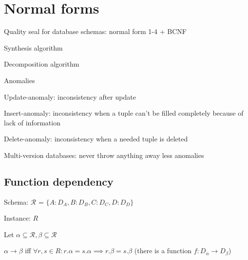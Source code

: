 \section{Normal forms}
\enumstart
	\item Quality seal for database schemas: normal form 1-4 + BCNF
	\item Synthesis algorithm
	\item Decomposition algorithm
	\item Anomalies
	\enumstart
		\item Update-anomaly: inconsistency after update
		\item Insert-anomaly: inconsistency when a tuple can't be filled completely because of lack of information
		\item Delete-anomaly: inconsistency when a needed tuple is deleted
	\enumend
	\item Multi-version databases: never throw anything away \arrow less anomalies
\enumend

\subsection{Function dependency}
\enumstart
	\item Schema: $\mathcal{R}$ = $\{A:D_A, B:D_B, C:D_C, D:D_D\}$
	\item Instance: $R$
	\item Let $\alpha \subseteq \mathcal{R}, \beta \subseteq \mathcal{R}$
	\item $\alpha \rightarrow \beta$ iff $\forall r,s \in R: r.\alpha=s.\alpha \implies r.\beta=s.\beta$ (there is a function $f: D_\alpha \rightarrow D_\beta$)
\enumend

